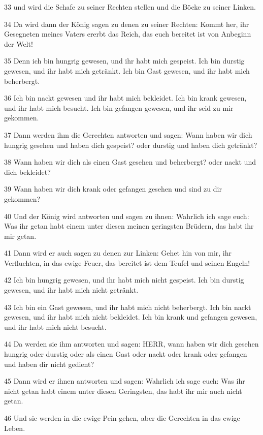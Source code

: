\par 33 und wird die Schafe zu seiner Rechten stellen und die Böcke zu seiner Linken.
\par 34 Da wird dann der König sagen zu denen zu seiner Rechten: Kommt her, ihr Gesegneten meines Vaters ererbt das Reich, das euch bereitet ist von Anbeginn der Welt!
\par 35 Denn ich bin hungrig gewesen, und ihr habt mich gespeist. Ich bin durstig gewesen, und ihr habt mich getränkt. Ich bin Gast gewesen, und ihr habt mich beherbergt.
\par 36 Ich bin nackt gewesen und ihr habt mich bekleidet. Ich bin krank gewesen, und ihr habt mich besucht. Ich bin gefangen gewesen, und ihr seid zu mir gekommen.
\par 37 Dann werden ihm die Gerechten antworten und sagen: Wann haben wir dich hungrig gesehen und haben dich gespeist? oder durstig und haben dich getränkt?
\par 38 Wann haben wir dich als einen Gast gesehen und beherbergt? oder nackt und dich bekleidet?
\par 39 Wann haben wir dich krank oder gefangen gesehen und sind zu dir gekommen?
\par 40 Und der König wird antworten und sagen zu ihnen: Wahrlich ich sage euch: Was ihr getan habt einem unter diesen meinen geringsten Brüdern, das habt ihr mir getan.
\par 41 Dann wird er auch sagen zu denen zur Linken: Gehet hin von mir, ihr Verfluchten, in das ewige Feuer, das bereitet ist dem Teufel und seinen Engeln!
\par 42 Ich bin hungrig gewesen, und ihr habt mich nicht gespeist. Ich bin durstig gewesen, und ihr habt mich nicht getränkt.
\par 43 Ich bin ein Gast gewesen, und ihr habt mich nicht beherbergt. Ich bin nackt gewesen, und ihr habt mich nicht bekleidet. Ich bin krank und gefangen gewesen, und ihr habt mich nicht besucht.
\par 44 Da werden sie ihm antworten und sagen: HERR, wann haben wir dich gesehen hungrig oder durstig oder als einen Gast oder nackt oder krank oder gefangen und haben dir nicht gedient?
\par 45 Dann wird er ihnen antworten und sagen: Wahrlich ich sage euch: Was ihr nicht getan habt einem unter diesen Geringsten, das habt ihr mir auch nicht getan.
\par 46 Und sie werden in die ewige Pein gehen, aber die Gerechten in das ewige Leben.

